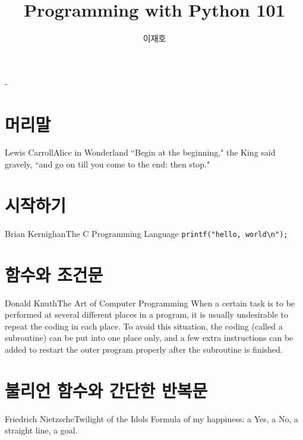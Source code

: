 \documentclass[a4paper,10pt]{memoir}
\title{Programming with Python 101}
\author{이재호}
\date{}
\begin{document}
\frontmatter
\begin{titlingpage}
  \setlength{\droptitle}{10.5cm}
  \calccentering{\unitlength}
  \begin{adjustwidth*}{\unitlength}{-\unitlength}
    \maketitle
  \end{adjustwidth*}
\end{titlingpage}

\tableofcontents

\chapter{머리말}
\begin{epi}{Lewis Carroll}{Alice in Wonderland}
  ``Begin at the beginning," the King said gravely, ``and go on till you come to the end: then stop."
\end{epi}


\mainmatter
\chapter{시작하기}
\begin{epi}{Brian Kernighan}{The C Programming Language}
  \texttt{printf("hello, world\textbackslash n");}
\end{epi}


\chapter{함수와 조건문}
\begin{epi}{Donald Knuth}{The Art of Computer Programming}
  When a certain task is to be performed at several different places in a program, it is usually undesirable to repeat the coding in each place.
  To avoid this situation, the coding (called a subroutine) can be put into one place only, and a few extra instructions can be added to restart the outer program properly after
the subroutine is finished.
\end{epi}


\chapter{불리언 함수와 간단한 반복문}
\begin{epi}{Friedrich Nietzsche}{Twilight of the Idols}
  Formula of my happiness: a Yes, a No, a straight line, a goal.
\end{epi}

\end{document}

